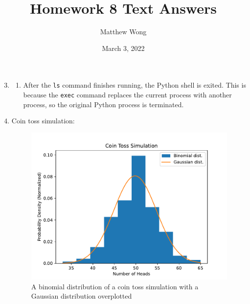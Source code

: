 \documentclass{article}
\title{Homework 8 Text Answers}
\author{Matthew Wong}
\date{March 3, 2022}
\begin{document}
\maketitle

\begin{enumerate}
\setcounter{enumi}{2}
\item
  \begin{enumerate}
  \item
    After the \texttt{ls} command finishes running, the Python shell is exited. This is because the
    \texttt{exec} command replaces the current process with another process, so the original Python
    process is terminated.
  \end{enumerate}

\setcounter{enumi}{4}
\item
  Coin toss simulation:
\begin{figure}[!hb]
  \includegraphics[width=\textwidth]{coinchart.pdf}
  \caption{A binomial distribution of a coin toss simulation with a Gaussian distribution
    overplotted}
  \centering
\end{figure}

\end{enumerate}
\end{document}
